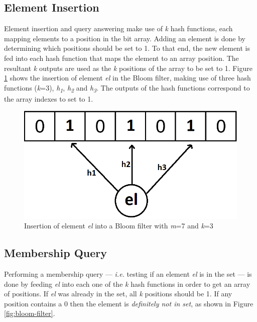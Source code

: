 \subsection*{Element Insertion}
Element insertion and query answering make use of \textit{k} hash functions, each mapping elements to a position in the bit array. Adding an element is done by determining which positions should be set to 1. To that end, the new element is fed into each hash function that maps the element to an array position. The resultant \textit{k} outputs are used as the \textit{k} positions of the array to be set to 1. Figure \ref{fig:insertion-bloom-filter} shows the insertion of element \textit{el} in the Bloom filter, making use of three hash functions (\textit{k}=3), \textit{h\textsubscript{1}}, \textit{h\textsubscript{2}} and \textit{h\textsubscript{3}}. The outputs of the hash functions correspond to the array indexes to set to 1.

\begin{figure}[!htb]
    \begin{center}
      \includegraphics[scale=0.4]{figures/insert-bloom.png}
      \caption[Bloom filter insertion]{Insertion of element \textit{el} into a Bloom filter with \textit{m}=7 and \textit{k}=3}
      \label{fig:insertion-bloom-filter}
    \end{center}
\end{figure}

\subsection*{Membership Query}
Performing a membership query --- \textit{i.e.} testing if an element \textit{el} is in the set --- is done by feeding \textit{el} into each one of the \textit{k} hash functions in order to get an array of positions. If \textit{el} was already in the set, all \textit{k} positions should be 1. If any position contains a 0 then the element is \textit{definitely not in set}, as shown in Figure \ref{fig:bloom-filter}. 

